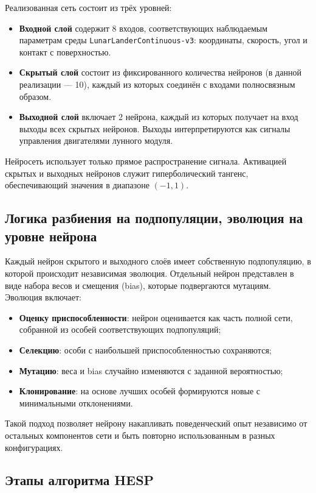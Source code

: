 \documentclass[a4paper,12pt]{article}
\begin{document}
Реализованная сеть состоит из трёх уровней:
\begin{itemize}
	\item \textbf{Входной слой} содержит 8 входов, соответствующих наблюдаемым параметрам среды \texttt{LunarLanderContinuous-v3}: координаты, скорость, угол и контакт с поверхностью.
	\item \textbf{Скрытый слой} состоит из фиксированного количества нейронов (в данной реализации — 10), каждый из которых соединён с входами полносвязным образом.
	\item \textbf{Выходной слой} включает 2 нейрона, каждый из которых получает на вход выходы всех скрытых нейронов. Выходы интерпретируются как сигналы управления двигателями лунного модуля.
\end{itemize}

Нейросеть использует только прямое распространение сигнала. Активацией скрытых и выходных нейронов служит гиперболический тангенс, обеспечивающий значения в диапазоне $(-1, 1)$.

\subsection{Логика разбиения на подпопуляции, эволюция на уровне нейрона}

Каждый нейрон скрытого и выходного слоёв имеет собственную подпопуляцию, в которой происходит независимая эволюция. Отдельный нейрон представлен в виде набора весов и смещения (bias), которые подвергаются мутациям. Эволюция включает:
\begin{itemize}
	\item \textbf{Оценку приспособленности}: нейрон оценивается как часть полной сети, собранной из особей соответствующих подпопуляций;
	\item \textbf{Селекцию}: особи с наибольшей приспособленностью сохраняются;
	\item \textbf{Мутацию}: веса и bias случайно изменяются с заданной вероятностью;
	\item \textbf{Клонирование}: на основе лучших особей формируются новые с минимальными отклонениями.
\end{itemize}

Такой подход позволяет нейрону накапливать поведенческий опыт независимо от остальных компонентов сети и быть повторно использованным в разных конфигурациях.

\subsection{Этапы алгоритма HESP}
\end{document}
